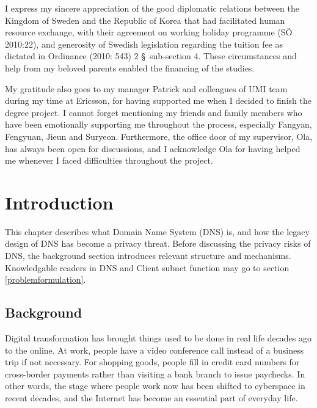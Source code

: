 \documentclass[a4paper,12pt]{article}
\begin{document}
\noindent I express my sincere appreciation of the good diplomatic relations between the Kingdom of Sweden and the Republic of Korea that had facilitated human resource exchange, with their agreement on working holiday programme (SÖ 2010:22), and generosity of Swedish legislation regarding the tuition fee as dictated in Ordinance (2010: 543) 2 \S \ sub-section 4.
These circumstances and help from my beloved parents enabled the financing of the studies.

My gratitude also goes to my manager Patrick and colleagues of UMI team during my time at Ericsson, for having supported me when I decided to finish the degree project.
I cannot forget mentioning my friends and family members who have been emotionally supporting me throughout the process, especially Fangyan, Fengyuan, Jieun and Suryeon. Furthermore, the office door of my supervisor, Ola, has always been open for discussions, and I acknowledge Ola for having helped me whenever I faced difficulties throughout the project.

\newpage
{}
\tableofcontents %
\newpage
{}

%
%

\section{Introduction}
This chapter describes what Domain Name System (DNS) is, and how the legacy design of DNS has become a privacy threat. Before discussing the privacy risks of DNS, the background section introduces relevant structure and mechanisms. Knowledgable readers in DNS and Client subnet function may go to section \ref{problemformulation}.

\subsection{Background}
Digital transformation has brought things used to be done in real life decades ago to the online. At work, people have a video conference call instead of a business trip if not necessary. For shopping goods, people fill in credit card numbers for cross-border payments rather than visiting a bank branch to issue paychecks. In other words, the stage where people work now has been shifted to cyberspace in recent decades, and the Internet has become an essential part of everyday life.
\end{document}
